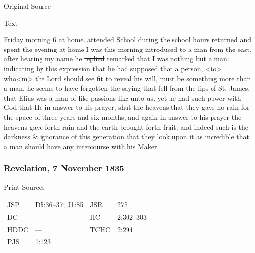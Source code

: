 			\begin{description}
				\item[Original Source]
			\end{description}
			
			
			\begin{description}
				\item[Text]
			\end{description}
				
				Friday morning 6 at home. attended School during the school hours returned and spent the evening at home I was this morning introduced to a man from the east, after hearing my name he \sout{replied} remarked that I was nothing but a man: indicating by this expression that he had supposed that a person, <to> who<m> the Lord should see fit to reveal his will, must be something more than a man, he seems to have forgotten the saying that fell from the lips of St. James, that Elias was a man of like passions like unto us, yet he had such power with God that He in answer to his prayer, shut the heavens that they gave no rain for the space of three years and six months, and again in answer to his prayer the heavens gave forth rain and the earth brought forth fruit; and indeed such is the darkness \& ignorance of this generation that they look upon it as incredible that a man should have any intercourse with his Maker.
				
		\subsubsection{Revelation, 7 November 1835}
			\label{EMS-1835-JS-7-NOV-1835}
			
			\begin{description}
				\item[Print Sources]
			\end{description}

				\begin{tabular}{p{0.5in}p{1in}p{0.5in}p{1in}}
				JSP	 	& D5:36--37; J1:85		& JSR 		& 275 \\
				DC	 	& --- 			& HC 		& 2:302--303 \\
				HDDC 	& ---			& TCHC 		& 2:294 \\
				PJS 	& 1:123			& 	 		&  \\
				\end{tabular}
			
